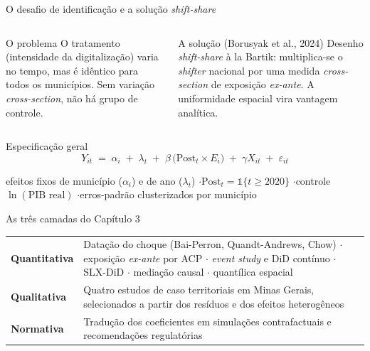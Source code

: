 \documentclass[aspectratio=169,10pt]{beamer}
\newcommand{\az}[1]{\textcolor{cedazul}{\textbf{#1}}}
\newcommand{\ex}{E_i}
\begin{document}
\begin{frame}{O desafio de identificação e a solução \emph{shift-share}}
  \begin{columns}[T]
    \begin{column}{0.49\textwidth}
      \begin{alertblock}{O problema}
        \small O tratamento (intensidade da digitalização) varia no tempo, mas é
        idêntico para todos os municípios. Sem variação \emph{cross-section}, não
        há grupo de controle.
      \end{alertblock}
    \end{column}
    \begin{column}{0.49\textwidth}
      \begin{block}{A solução (Borusyak et al., 2024)}
        \small Desenho \emph{shift-share} à la Bartik: multiplica-se o
        \emph{shifter} nacional por uma medida \emph{cross-section} de exposição
        \emph{ex-ante}. A uniformidade espacial vira vantagem analítica.
      \end{block}
    \end{column}
  \end{columns}

  \vspace{0.2em}
  \begin{exampleblock}{Especificação geral}
    \vspace{-0.9em}
    \[
      Y_{it} \;=\; \alpha_i \;+\; \lambda_t \;+\;
      \beta\,\bigl(\text{Post}_t \times \ex\bigr) \;+\;
      \gamma X_{it} \;+\; \varepsilon_{it}
    \]
    \vspace{-1.1em}
    \begin{center}
      {\scriptsize\color{cedcinza}
       efeitos fixos de município ($\alpha_i$) e de ano ($\lambda_t$)
       \quad$\cdot$\quad $\text{Post}_t = \mathbb{1}\{t \geq 2020\}$
       \quad$\cdot$\quad controle $\ln(\text{PIB real})$
       \quad$\cdot$\quad erros-padrão clusterizados por município}
    \end{center}
  \end{exampleblock}

  \vspace{-0.2em}
  \begin{block}{As três camadas do Capítulo 3}
    \scriptsize
    \begin{tabular}{@{}P{0.16\textwidth}P{0.79\textwidth}@{}}
      \az{Quantitativa} & Datação do choque (Bai-Perron, Quandt-Andrews, Chow)
        $\cdot$ exposição \emph{ex-ante} por ACP $\cdot$ \emph{event study} e DiD
        contínuo $\cdot$ SLX-DiD $\cdot$ mediação causal $\cdot$ quantílica espacial\\
      \az{Qualitativa} & Quatro estudos de caso territoriais em Minas Gerais,
        selecionados a partir dos resíduos e dos efeitos heterogêneos\\
      \az{Normativa} & Tradução dos coeficientes em simulações contrafactuais e
        recomendações regulatórias\\
    \end{tabular}
  \end{block}
\end{frame}
\end{document}
